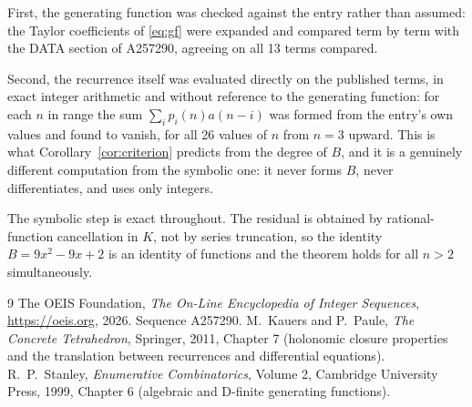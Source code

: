 \documentclass[11pt,a4paper]{article}
\theoremstyle{plain}
\theoremstyle{definition}
\begin{document}
First, the generating function was checked against the entry rather than assumed: the
Taylor coefficients of \eqref{eq:gf} were expanded and compared term by term with the DATA
section of A257290, agreeing on all 13 terms compared.

Second, the recurrence itself was evaluated directly on the published terms, in exact
integer arithmetic and without reference to the generating function: for each $n$ in range
the sum $\sum_{i}p_{i}(n)a(n-i)$ was formed from the entry's own values and found to
vanish, for all 26 values of $n$ from $n=3$ upward. This is what
Corollary~\ref{cor:criterion} predicts from the degree of $B$, and it is a genuinely
different computation from the symbolic one: it never forms $B$, never differentiates, and
uses only integers.

The symbolic step is exact throughout. The residual is obtained by rational-function
cancellation in $K$, not by series truncation, so the identity $B=9 x^{2} - 9 x + 2$ is an
identity of functions and the theorem holds for all $n>2$ simultaneously.

\begin{thebibliography}{9}
 The OEIS Foundation, \emph{The On-Line Encyclopedia of Integer Sequences},
\url{https://oeis.org}, 2026. Sequence A257290.
 M.~Kauers and P.~Paule, \emph{The Concrete Tetrahedron}, Springer, 2011,
Chapter 7 (holonomic closure properties and the translation between recurrences and
differential equations).
 R.~P.~Stanley, \emph{Enumerative Combinatorics}, Volume 2, Cambridge
University Press, 1999, Chapter 6 (algebraic and D-finite generating functions).
\end{thebibliography}
\end{document}
